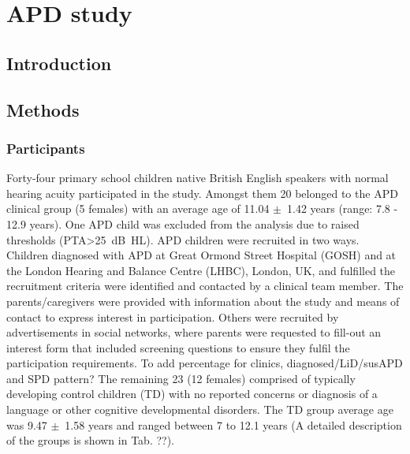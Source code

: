 \documentclass[a4paper,nobind]{templates/ociamthesis}
\begin{document}
\setlength{\textbaselineskip}{22pt plus2pt}

\setlength{\parskip}{2pt plus 1pt}

\setlength{\baselineskip}{\textbaselineskip}

\hypertarget{APD-study}{%
\chapter{APD study}\label{APD-study}}


\minitoc 

\hypertarget{introduction}{%
\section{Introduction}\label{introduction}}

\hypertarget{methods}{%
\section{Methods}\label{methods}}

\hypertarget{participants}{%
\subsection{Participants}\label{participants}}

Forty-four primary school children native British English speakers with
normal hearing acuity participated in the study. Amongst them 20
belonged to the APD clinical group (5 females) with an average age of
11.04 \(\pm\)~1.42 years (range: 7.8 - 12.9 years). One APD child was
excluded from the analysis due to raised thresholds
(PTA\textgreater25~dB~HL). APD children were recruited in two ways.
Children diagnosed with APD at Great Ormond Street Hospital (GOSH) and
at the London Hearing and Balance Centre (LHBC), London, UK, and
fulfilled the recruitment criteria were identified and contacted by a
clinical team member. The parents/caregivers were provided with
information about the study and means of contact to express interest in
participation. Others were recruited by advertisements in social
networks, where parents were requested to fill-out an interest form that
included screening questions to ensure they fulfil the participation
requirements. {To add percentage for clinics, diagnosed/LiD/susAPD and
SPD pattern?} The remaining 23 (12 females) comprised of typically
developing control children (TD) with no reported concerns or diagnosis
of a language or other cognitive developmental disorders. The TD group
average age was 9.47 \(\pm\)~1.58 years and ranged between 7 to 12.1
years (A detailed description of the groups is shown in Tab. ??).
\end{document}
